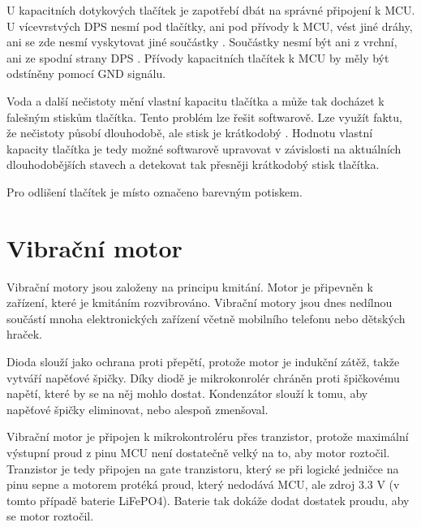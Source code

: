 U kapacitních dotykových tlačítek je zapotřebí dbát na správné připojení k MCU. U vícevrstvých DPS nesmí pod tlačítky, ani pod přívody
k MCU, vést jiné dráhy, ani se zde nesmí vyskytovat jiné součástky \cite{PrincipKapTl}. Součástky nesmí být ani z vrchní, ani ze spodní 
strany DPS \cite{PrincipKapTl}. Přívody kapacitních tlačítek k MCU by měly být odstíněny pomocí GND signálu.

Voda a další nečistoty mění vlastní kapacitu tlačítka a může tak docházet k falešným stiskům tlačítka. Tento problém lze řešit softwarově. 
Lze využít faktu, že nečistoty působí dlouhodobě, ale stisk je krátkodobý \cite{PrincipKapTl}. Hodnotu vlastní kapacity tlačítka je tedy
možné softwarově upravovat v závislosti na aktuálních dlouhodobějších stavech a detekovat tak přesněji krátkodobý stisk tlačítka.



Pro odlišení tlačítek je místo označeno barevným potiskem. 

\section{Vibrační motor}
Vibrační motory jsou založeny na principu kmitání. Motor je připevněn k zařízení, které je kmitáním rozvibrováno. Vibrační motory jsou dnes 
nedílnou součástí mnoha elektronických zařízení včetně mobilního telefonu nebo dětských hraček. 

Dioda slouží jako ochrana proti přepětí, protože motor je indukční zátěž, takže vytváří napěťové špičky. Díky diodě je mikrokonrolér chráněn 
proti špičkovému napětí, které by se na něj mohlo dostat. Kondenzátor slouží k tomu, aby napěťové špičky eliminovat, nebo alespoň zmenšoval. 

Vibrační motor je připojen k mikrokontroléru přes tranzistor, protože maximální výstupní proud z pinu MCU není dostatečně velký na to, aby 
motor roztočil. Tranzistor je tedy připojen na gate tranzistoru, který se při logické jedničce na pinu sepne a motorem protéká proud, který 
nedodává MCU, ale zdroj 3.3 V (v tomto případě baterie LiFePO4). Baterie tak dokáže dodat dostatek proudu, aby se motor roztočil. 

